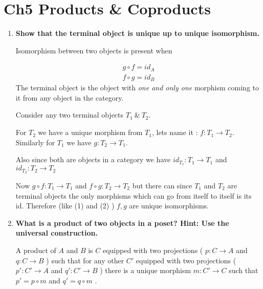 \documentclass{article}
\begin{document}
\section{Ch5 Products \& Coproducts}
\begin{enumerate}
	\item \textbf{Show that the terminal object is unique up to unique isomorphism.}

	      Isomorphism between two objects is present when


	      \begin{align}
		      g \circ f = id_A \\
		      f \circ g = id_B
	      \end{align}
	      The terminal object is the object with \textit{one and only one} morphism
	      coming to it from any object in the category.

	      Consider any two terminal objects $ T_1 \ \& \ T_2 $.

	      For $ T_2 $ we have a unique morphism from $ T_1 $, lets name it : $ f : T_1 \to T_2 $. Similarly for $ T_1 $ we have $ g : T_2 \to T_1 $.

	      Also since both are objects in a category we have
	      $ id_{T_1} : T_1 \to T_1 $ and
	      $ id_{T_2} : T_2 \to T_2 $

	      Now $ g \circ f : T_1 \to T_1 $  and $ f \circ g : T_2 \to T_2 $ but there can since $ T_1 $ and $ T_2 $ are terminal objects the only morphisms which can go from itself to itself is its id. Therefore (like (1) and (2) ) $ f, g $ are unique isomorphisms.


	\item \textbf{What is a product of two objects in a poset? Hint: Use the universal construction.}

	      A product of $ A $ and $ B $ is $ C $ equipped with two projections ( $ p : C \to A $ and $ q : C \to B $ ) such that for any other $ C' $ equipped with two projections ( $ p' : C' \to A $ and $ q' : C' \to B $ ) there is a unique morphism $ m : C' \to C $ such that
	      $ p' = p \circ m $ and $ q' = q \circ m $ .




\end{enumerate}
\end{document}
